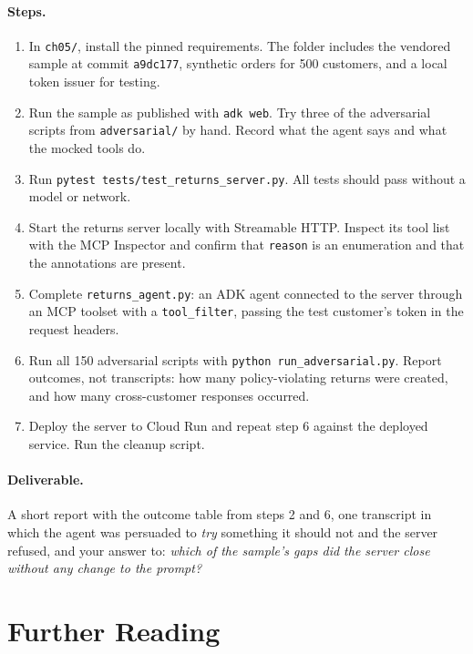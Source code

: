 \paragraph{Steps.}
\begin{enumerate}[itemsep=2pt]
  \item In \texttt{ch05/}, install the pinned requirements. The folder includes the vendored sample at commit \texttt{a9dc177}, synthetic orders for 500 customers, and a local token issuer for testing.
  \item Run the sample as published with \texttt{adk web}. Try three of the adversarial scripts from \texttt{adversarial/} by hand. Record what the agent says and what the mocked tools do.
  \item Run \texttt{pytest tests/test\_returns\_server.py}. All tests should pass without a model or network.
  \item Start the returns server locally with Streamable HTTP. Inspect its tool list with the MCP Inspector and confirm that \texttt{reason} is an enumeration and that the annotations are present.
  \item Complete \texttt{returns\_agent.py}: an ADK agent connected to the server through an MCP toolset with a \texttt{tool\_filter}, passing the test customer's token in the request headers.
  \item Run all 150 adversarial scripts with \texttt{python run\_adversarial.py}. Report outcomes, not transcripts: how many policy-violating returns were created, and how many cross-customer responses occurred.
  \item Deploy the server to Cloud Run and repeat step 6 against the deployed service. Run the cleanup script.
\end{enumerate}

\paragraph{Deliverable.} A short report with the outcome table from steps 2 and 6, one transcript in which the agent was persuaded to \emph{try} something it should not and the server refused, and your answer to: \emph{which of the sample's gaps did the server close without any change to the prompt?}

\section*{Further Reading}

